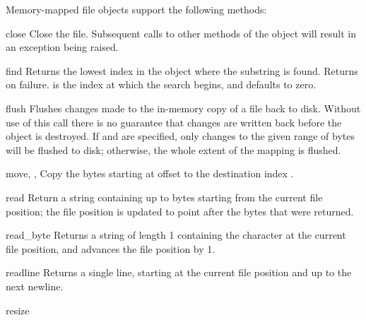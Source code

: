 Memory-mapped file objects support the following methods:


\begin{methoddesc}{close}{}
Close the file.  Subsequent calls to other methods of the object
will result in an exception being raised.
\end{methoddesc}

\begin{methoddesc}{find}{ }
  Returns the lowest index in the object where the substring  is
  found.  Returns  on failure.
   is the index at which the search begins, and defaults to zero.
\end{methoddesc}

\begin{methoddesc}{flush}{}
Flushes changes made to the in-memory copy of a file back to disk.
Without use of this call there is no guarantee that changes are
written back before the object is destroyed.  If  and
 are specified, only changes to the given range of bytes
will be flushed to disk; otherwise, the whole extent of the mapping is
flushed.
\end{methoddesc}

\begin{methoddesc}{move}{, , }
Copy the  bytes starting at offset  
to the destination index .
\end{methoddesc}

\begin{methoddesc}{read}{}
Return a string containing up to  bytes starting from the
current file position; the file position is updated to point after the
bytes that were returned. 
\end{methoddesc}

\begin{methoddesc}{read_byte}{}
Returns a string of length 1 containing the character at the current
file position, and advances the file position by 1.
\end{methoddesc}

\begin{methoddesc}{readline}{}
Returns a single line, starting at the current file position and up to 
the next newline.
\end{methoddesc}

\begin{methoddesc}{resize}{}
\end{methoddesc}

